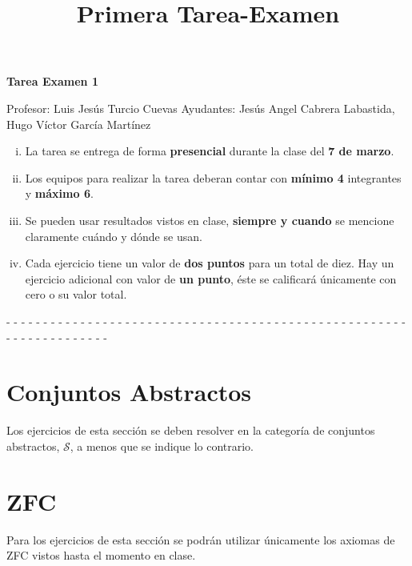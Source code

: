 \documentclass[10pt]{article}
\title{Primera Tarea-Examen}
\author{}
\date{}
\newcommand{\topos}[1]{\mathscr{#1}}
\begin{document}

    \begin{center}
        \huge \textbf{Tarea Examen 1} \\ \normalsize
    \end{center}

    \begin{flushright}
        Profesor: Luis Jesús Turcio Cuevas \hfill Ayudantes: Jesús Angel Cabrera Labastida, \\
        Hugo Víctor García Martínez
    \end{flushright}

    \begin{enumerate}[i)]
        \item La tarea se entrega de forma \textbf{presencial} durante la clase del \textbf{7 de marzo}.
        \item Los equipos para realizar la tarea deberan contar con \textbf{mínimo 4} integrantes y \textbf{máximo 6}.
        \item Se pueden usar resultados vistos en clase, \textbf{siempre y cuando} se mencione claramente cuándo y dónde se usan.
        \item Cada ejercicio tiene un valor de \textbf{dos puntos} para un total de diez. Hay un ejercicio adicional con valor de \textbf{un punto}, éste se calificará únicamente con cero o su valor total.
    \end{enumerate}

    \begin{center}
        - - - - - - - - - - - - - - - - - - - - - - - - - - - - - - - - - - - - - - - - - - - - - - - - - - - - - - - - - - - - - - - - - - - - 
    \end{center}

    \section*{Conjuntos Abstractos}
    Los ejercicios de esta sección se deben resolver en la categoría de
    conjuntos abstractos, \(\topos{S}\), a menos que se indique lo contrario.

    
    

    \section*{ZFC}
    Para los ejercicios de esta sección se podrán utilizar únicamente los axiomas de ZFC vistos hasta el momento en clase. 
\end{document}
